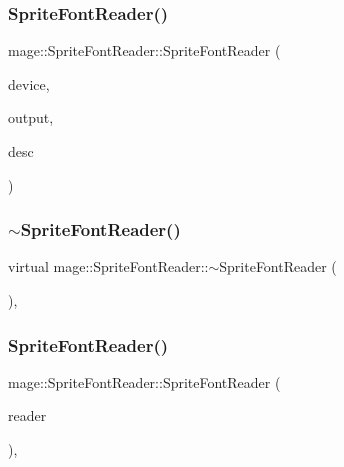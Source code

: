 \subsubsection{\texorpdfstring{Sprite\+Font\+Reader()}{SpriteFontReader()}\hspace{0.1cm}{\footnotesize\ttfamily [1/3]}}
{\footnotesize\ttfamily mage\+::\+Sprite\+Font\+Reader\+::\+Sprite\+Font\+Reader (\begin{DoxyParamCaption}\item[{I\+D3\+D11\+Device2 $\ast$}]{device,  }\item[{\hyperlink{structmage_1_1_sprite_font_output}{Sprite\+Font\+Output} \&}]{output,  }\item[{const \hyperlink{structmage_1_1_sprite_font_descriptor}{Sprite\+Font\+Descriptor} \&}]{desc }\end{DoxyParamCaption})}

\hypertarget{classmage_1_1_sprite_font_reader_a296715f88672f810a6e4b74f74840c53}{}\label{classmage_1_1_sprite_font_reader_a296715f88672f810a6e4b74f74840c53} 
\subsubsection{\texorpdfstring{$\sim$\+Sprite\+Font\+Reader()}{~SpriteFontReader()}}
{\footnotesize\ttfamily virtual mage\+::\+Sprite\+Font\+Reader\+::$\sim$\+Sprite\+Font\+Reader (\begin{DoxyParamCaption}{ }\end{DoxyParamCaption})\hspace{0.3cm}{\ttfamily [virtual]}, {\ttfamily [default]}}

\hypertarget{classmage_1_1_sprite_font_reader_a81f2b8ceab31ea5006d2bef498a03bbc}{}\label{classmage_1_1_sprite_font_reader_a81f2b8ceab31ea5006d2bef498a03bbc} 
\subsubsection{\texorpdfstring{Sprite\+Font\+Reader()}{SpriteFontReader()}\hspace{0.1cm}{\footnotesize\ttfamily [2/3]}}
{\footnotesize\ttfamily mage\+::\+Sprite\+Font\+Reader\+::\+Sprite\+Font\+Reader (\begin{DoxyParamCaption}\item[{const \hyperlink{classmage_1_1_sprite_font_reader}{Sprite\+Font\+Reader} \&}]{reader }\end{DoxyParamCaption})\hspace{0.3cm}{\ttfamily [private]}, {\ttfamily [delete]}}

